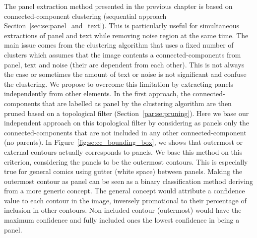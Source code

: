 The panel extraction method presented in the previous chapter is based on connected-component clustering (sequential approach Section~\ref{sec:se:panel_and_text}).
This is particularly useful for simultaneous extractions of panel and text while removing noise region at the same time.
The main issue comes from the clustering algorithm that uses a fixed number of clusters which assumes that the image contents a connected-components from panel, text and noise (their are dependent from each other).
This is not always the case or sometimes the amount of text or noise is not significant and confuse the clustering.
We propose to overcome this limitation by extracting panels independently from other elements.
In the first approach, the connected-components that are labelled as panel by the clustering algorithm are then pruned based on a topological filter (Section~\ref{par:se:pruning}).
Here we base our independent approach on this topological filter by considering as panels only the connected-components that are not included in any other connected-component (no parents).
In Figure~\ref{fig:se:cc_bounding_box}, we shows that outermost or external contours actually corresponds to panels.
We base this method on this criterion, considering the panels to be the outermost contours.
This is especially true for general comics using gutter (white space) between panels.
Making the outermost contour as panel can be seen as a binary classification method deriving from a more generic concept.
The general concept would attribute a confidence value to each contour in the image, inversely promotional to their percentage of inclusion in other contours.
Non included contour (outermost) would have the maximum confidence and fully included ones the lowest confidence in being a panel.


